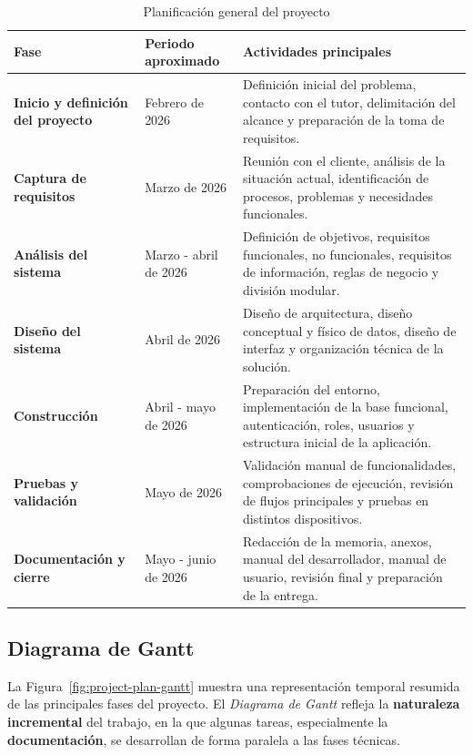 \begin{table}[htbp]
    \centering
    \small
    \caption{Planificación general del proyecto}
    \label{tab:project-plan-schedule}
    \begin{tabularx}{\textwidth}{|L{3.5cm}|L{2.8cm}|Y|}
        \hline
        \textbf{Fase} & \textbf{Periodo aproximado} & \textbf{Actividades principales} \\
        \hline
        \textbf{Inicio y definición del proyecto} & Febrero de 2026 & Definición inicial del problema, contacto con el tutor, delimitación del alcance y preparación de la toma de requisitos. \\
        \hline
        \textbf{Captura de requisitos} & Marzo de 2026 & Reunión con el cliente, análisis de la situación actual, identificación de procesos, problemas y necesidades funcionales. \\
        \hline
        \textbf{Análisis del sistema} & Marzo - abril de 2026 & Definición de objetivos, requisitos funcionales, no funcionales, requisitos de información, reglas de negocio y división modular. \\
        \hline
        \textbf{Diseño del sistema} & Abril de 2026 & Diseño de arquitectura, diseño conceptual y físico de datos, diseño de interfaz y organización técnica de la solución. \\
        \hline
        \textbf{Construcción} & Abril - mayo de 2026 & Preparación del entorno, implementación de la base funcional, autenticación, roles, usuarios y estructura inicial de la aplicación. \\
        \hline
        \textbf{Pruebas y validación} & Mayo de 2026 & Validación manual de funcionalidades, comprobaciones de ejecución, revisión de flujos principales y pruebas en distintos dispositivos. \\
        \hline
        \textbf{Documentación y cierre} & Mayo - junio de 2026 & Redacción de la memoria, anexos, manual del desarrollador, manual de usuario, revisión final y preparación de la entrega. \\
        \hline
    \end{tabularx}
\end{table}
\subsection{Diagrama de Gantt}

La Figura~\ref{fig:project-plan-gantt} muestra una representación temporal resumida de las principales fases del proyecto. El \textit{Diagrama de Gantt} refleja la \textbf{naturaleza incremental} del trabajo, en la que algunas tareas, especialmente la \textbf{documentación}, se desarrollan de forma paralela a las fases técnicas.

